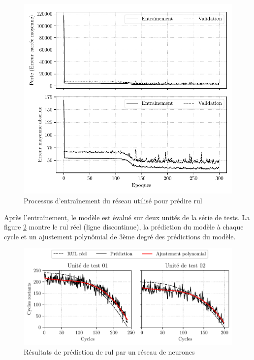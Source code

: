\begin{figure}[H]
    \centering
    \includegraphics{figures/cmapss_regression_training_fr.pdf}
    \caption{Processus d'entraînement du réseau utilisé pour prédire \acrshort{rul}}
    \label{fig:cmapss-regression-training}
\end{figure}

Après l'entraînement, le modèle est évalué sur deux unités de la série de tests. La figure \ref{fig:cmapss-regression-prediction} montre le \acrshort{rul} réel (ligne discontinue), la prédiction du modèle à chaque cycle et un ajustement polynômial de 3ème degré des prédictions du modèle.

\begin{figure}[H]
    \centering
    \includegraphics{figures/cmapss_regression_predictions_fr.pdf}
    \caption{Résultats de prédiction de \acrshort{rul} par un réseau de neurones}
    \label{fig:cmapss-regression-prediction}
\end{figure}

